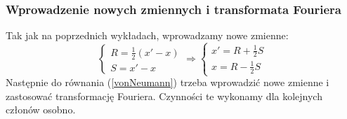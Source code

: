 \subsubsection{Wprowadzenie nowych zmiennych i transformata Fouriera}
Tak jak na poprzednich wykładach, wprowadzamy nowe zmienne:
\begin{equation}\begin{cases} R=\frac{1}{2}(x'-x)\\ S=x'-x \end{cases} \Rightarrow  \begin{cases}  x'=R+\frac{1}{2}S\\ x=R-\frac{1}{2}S\end{cases}
\end{equation}
Następnie do równania (\ref{vonNeumann}) trzeba wprowadzić nowe zmienne i zastosować transformację Fouriera. Czynności te wykonamy dla kolejnych członów osobno.
